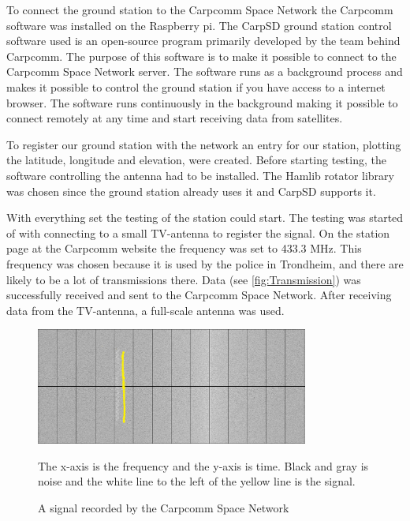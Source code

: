 To connect the ground station to the Carpcomm Space Network the Carpcomm software was installed on the Raspberry pi. The CarpSD ground station control software used is an open-source program primarily developed by the team behind Carpcomm. The purpose of this software is to make it possible to connect to the Carpcomm Space Network server. The software runs as a background process and makes it possible to control the ground station if you have access to a internet browser. The software runs continuously in the background making it possible to connect remotely at any time and start receiving data from satellites.

To register our ground station with the network an entry for our station, plotting the latitude, longitude and elevation, were created. 
Before starting testing, the software controlling the antenna had to be installed. The Hamlib rotator library was chosen since the ground station already uses it and CarpSD supports it. 

With everything set the testing of the station could start. The testing was started of with connecting to a small TV-antenna to register the signal. On the station page at the Carpcomm website the frequency was set to 433.3 MHz. This frequency was chosen because it is used by the police in Trondheim, and there are likely to be a lot of transmissions there. Data (see \autoref{fig:Transmission}) was successfully received and sent to the Carpcomm Space Network. After receiving data from the TV-antenna, a full-scale antenna was used.

\begin{figure}
	\centering
	\includegraphics[width=0.8\textwidth]{Figures/sattelite_transmition}
	\label{fig:Transmission}
	\caption{A signal recorded by the Carpcomm Space Network}
The x-axis is the frequency and the y-axis is time. Black and gray is noise and the white line to the left of the yellow line is the signal.
\end{figure}



